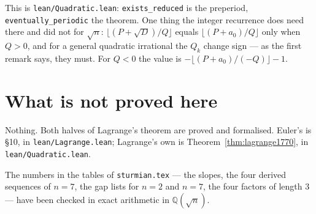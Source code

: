 \documentclass[11pt,a4paper]{article}
\theoremstyle{definition}
\theoremstyle{plain}
\begin{document}
This is \texttt{lean/Quadratic.lean}: \texttt{exists\_reduced} is the preperiod,
\texttt{eventually\_periodic} the theorem. One thing the integer recurrence does
need there and did not for $\sqrt n$: $\lfloor (P + \sqrt D)/Q\rfloor$ equals
$\lfloor (P + a_0)/Q\rfloor$ only when $Q > 0$, and for a general quadratic
irrational the $Q_k$ change sign --- as the first remark says, they must. For
$Q < 0$ the value is $-\lfloor (P + a_0)/(-Q)\rfloor - 1$.

\section{What is not proved here}

Nothing. Both halves of Lagrange's theorem are proved and formalised. Euler's
is \S10, in \texttt{lean/Lagrange.lean}; Lagrange's own is
Theorem~\ref{thm:lagrange1770}, in \texttt{lean/Quadratic.lean}.

The numbers in the tables of \texttt{sturmian.tex} --- the slopes, the four
derived sequences of $n = 7$, the gap lists for $n = 2$ and $n = 7$, the four
factors of length $3$ --- have been checked in exact arithmetic in
$\mathbb{Q}(\sqrt n)$.
\end{document}
